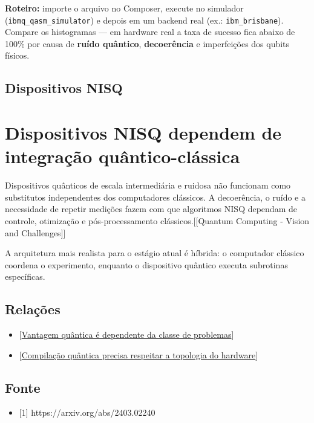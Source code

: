 \documentclass[
  brazilian,
]{report}
\providecommand{\tightlist}{%
  \setlength{\itemsep}{0pt}\setlength{\parskip}{0pt}}
\begin{document}
\textbf{Roteiro:} importe o arquivo no Composer, execute no simulador
(\texttt{ibmq\_qasm\_simulator}) e depois em um backend real (ex.:
\texttt{ibm\_brisbane}). Compare os histogramas --- em hardware real a
taxa de sucesso fica abaixo de 100\% por causa de \textbf{ruído
quântico}, \textbf{decoerência} e imperfeições dos qubits físicos.

\section{Dispositivos NISQ}\label{dispositivos-nisq}

\chapter{Dispositivos NISQ dependem de integração
quântico-clássica}\label{dispositivos-nisq-dependem-de-integrauxe7uxe3o-quuxe2ntico-cluxe1ssica}

Dispositivos quânticos de escala intermediária e ruidosa não funcionam
como substitutos independentes dos computadores clássicos. A
decoerência, o ruído e a necessidade de repetir medições fazem com que
algoritmos NISQ dependam de controle, otimização e pós-processamento
clássicos.{[}{[}Quantum Computing - Vision and Challenges{]}{]}

A arquitetura mais realista para o estágio atual é híbrida: o computador
clássico coordena o experimento, enquanto o dispositivo quântico executa
subrotinas específicas.

\section{Relações}\label{relauxe7uxf5es}

\begin{itemize}
\tightlist
\item
  {[}\hyperref[vantagem-quuxe2ntica-uxe9-dependente-da-classe-de-problemas]{Vantagem
  quântica é dependente da classe de problemas}{]}
\item
  {[}\hyperref[compilauxe7uxe3o-quuxe2ntica-precisa-respeitar-a-topologia-do-hardware]{Compilação
  quântica precisa respeitar a topologia do hardware}{]}
\end{itemize}

\section{Fonte}\label{fonte}

\begin{itemize}
\tightlist
\item
  {[}1{]} https://arxiv.org/abs/2403.02240
\end{itemize}
\end{document}
